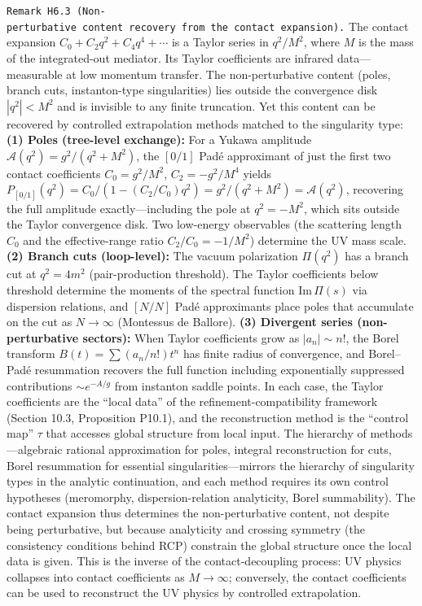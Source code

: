 \documentclass[
]{article}
\begin{document}
\texttt{Remark\ H6.3\ (Non-perturbative\ content\ recovery\ from\ the\ contact\ expansion).}
The contact expansion \(C_0+C_2 q^2+C_4 q^4+\cdots\) is a Taylor series
in \(q^2/M^2\), where \(M\) is the mass of the integrated-out mediator.
Its Taylor coefficients are infrared data---measurable at low momentum
transfer. The non-perturbative content (poles, branch cuts,
instanton-type singularities) lies outside the convergence disk
\(|q^2|<M^2\) and is invisible to any finite truncation. Yet this
content can be recovered by controlled extrapolation methods matched to
the singularity type: \textbf{(1) Poles (tree-level exchange):} For a
Yukawa amplitude \(\mathcal A(q^2)=g^2/(q^2+M^2)\), the \([0/1]\) Padé
approximant of just the first two contact coefficients \(C_0=g^2/M^2\),
\(C_2=-g^2/M^4\) yields
\(P_{[0/1]}(q^2)=C_0/(1-(C_2/C_0)q^2)=g^2/(q^2+M^2)=\mathcal A(q^2)\),
recovering the full amplitude exactly---including the pole at
\(q^2=-M^2\), which sits outside the Taylor convergence disk. Two
low-energy observables (the scattering length \(C_0\) and the
effective-range ratio \(C_2/C_0=-1/M^2\)) determine the UV mass scale.
\textbf{(2) Branch cuts (loop-level):} The vacuum polarization
\(\Pi(q^2)\) has a branch cut at \(q^2=4m^2\) (pair-production
threshold). The Taylor coefficients below threshold determine the
moments of the spectral function \(\mathrm{Im}\,\Pi(s)\) via dispersion
relations, and \([N/N]\) Padé approximants place poles that accumulate
on the cut as \(N\to\infty\) (Montessus de Ballore). \textbf{(3)
Divergent series (non-perturbative sectors):} When Taylor coefficients
grow as \(|a_n|\sim n!\), the Borel transform \(B(t)=\sum(a_n/n!)t^n\)
has finite radius of convergence, and Borel--Padé resummation recovers
the full function including exponentially suppressed contributions
\(\sim e^{-A/g}\) from instanton saddle points. In each case, the Taylor
coefficients are the ``local data'' of the refinement-compatibility
framework (Section 10.3, Proposition P10.1), and the reconstruction
method is the ``control map'' \(\tau\) that accesses global structure
from local input. The hierarchy of methods---algebraic rational
approximation for poles, integral reconstruction for cuts, Borel
resummation for essential singularities---mirrors the hierarchy of
singularity types in the analytic continuation, and each method requires
its own control hypotheses (meromorphy, dispersion-relation analyticity,
Borel summability). The contact expansion thus determines the
non-perturbative content, not despite being perturbative, but because
analyticity and crossing symmetry (the consistency conditions behind
RCP) constrain the global structure once the local data is given. This
is the inverse of the contact-decoupling process: UV physics collapses
into contact coefficients as \(M\to\infty\); conversely, the contact
coefficients can be used to reconstruct the UV physics by controlled
extrapolation.
\end{document}
